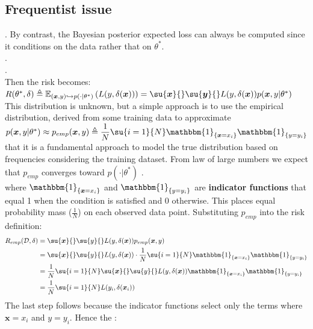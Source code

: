 \subsection{Frequentist issue}
. By contrast, the Bayesian posterior expected loss can always be computed 
since it conditions on the data rather that on $\theta^{*}$.\\
.\\
.\\
Then the risk becomes:
$R(\theta^{*}, \delta) \triangleq \mathbb{E}_{(\bm{x}, y)\hookrightarrow p(\cdot|\theta^{*})}\left(L(y,
\delta(\bm{x}))\right) = \su{\bm{x}}{}\su{\bm{y}}{}L(y, \delta(\bm{x}))p(\bm{x}, y|\theta^{*})$
This distribution is unknown, but a simple approach is to use the empirical distribution,
derived from some training data to approximate $p(\bm{x},y|\theta^{*})\approx
p_{emp}(\bm{x},y) \triangleq \dfrac{1}{N}\su{i=1}{N}\mathbbm{1}_{\{\bm{x}=x_{i}\}}\mathbbm{1}_{\{y=y_{i}\}}$
that it is a fundamental approach to model the true distribution based on frequencies considering the
training dataset. From law of large numbers we expect that $p_{emp}$ converges toward $p(\cdot|\theta^{*})$ .\\
where $\mathbbm{1}_{\{\bm{x}=x_{i}\}}$ and $\mathbbm{1}_{\{y=y_{i}\}}$ are \textbf{indicator functions}
that equal 1 when the condition is satisfied and 0 otherwise.
This places equal probability mass ($\frac{1}{N}$) on each observed data point.
Substituting $p_{emp}$ into the risk definition:
\begin{align*}
R_{emp}(\mathcal{D}, \delta) &= \su{\bm{x}}{}\su{y}{}L(y, \delta(\bm{x}))p_{emp}(\bm{x}, y)\\
&= \su{\bm{x}}{}\su{y}{}L(y, \delta(\bm{x})) \cdot \dfrac{1}{N}\su{i=1}{N}\mathbbm{1}_{\{\bm{x}=x_{i}\}}\mathbbm{1}_{\{y=y_{i}\}}\\
&= \dfrac{1}{N}\su{i=1}{N}\su{\bm{x}}{}\su{y}{}L(y, \delta(\bm{x}))\mathbbm{1}_{\{\bm{x}=x_{i}\}}\mathbbm{1}_{\{y=y_{i}\}}\\
&= \dfrac{1}{N}\su{i=1}{N}L(y_{i}, \delta(\bm{x}_{i}))
\end{align*}
The last step follows because the indicator functions select only the terms where $\bm{x}=x_i$ and $y=y_i$.
Hence the :


